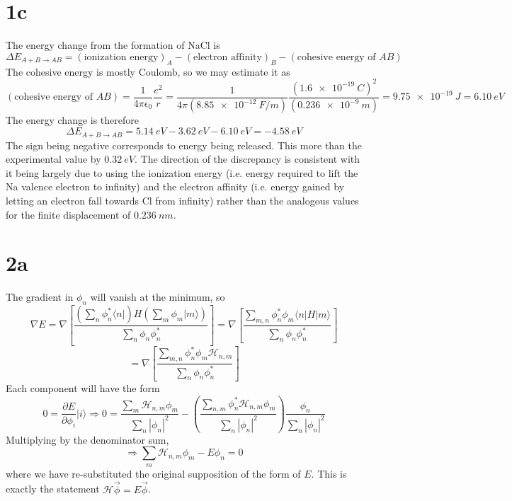 \documentclass{article}
\begin{document}
\section*{1c}
The energy change from the formation of NaCl is
\[\Delta E_{A+B\rightarrow AB}=(\textrm{ionization energy})_{A}-(\textrm{electron affinity})_{B}-(\textrm{cohesive energy of }AB)\]
The cohesive energy is mostly Coulomb, so we may estimate it as
\[
  (\textrm{cohesive energy of }AB)
  =\frac{1}{4\pi\epsilon_{0}}\frac{e^{2}}{r}
  =\frac{1}{4\pi(\SI{8.85e-12}{F/m})}\frac{(\SI{1.6e-19}{C})^{2}}{(\SI{0.236e-9}{m})}
  =\SI{9.75e-19}{J}=\SI{6.10}{eV}
\]
The energy change is therefore
\[
  \Delta E_{A+B\rightarrow AB}=\SI{5.14}{eV}-\SI{3.62}{eV}-\SI{6.10}{eV}=\SI{-4.58}{eV}
\]
The sign being negative corresponds to energy being released.
This more than the experimental value by $\SI{0.32}{eV}$.
The direction of the discrepancy is consistent with it being largely due to using the ionization energy
(i.e. energy required to lift the Na valence electron to infinity) and the electron affinity
(i.e. energy gained by letting an electron fall towards Cl from infinity) rather than the analogous values for the finite displacement
of $\SI{0.236}{nm}$.

\section*{2a}
The gradient in $\phi_{n}$ will vanish at the minimum, so
\[
  \nabla E=\nabla\left[\frac{\left( \sum_{n}\phi_{n}^{*}\langle n | \right)
      H\left(\sum_{m}\phi_{m}|m\rangle \right)}
    {\sum_{n}\phi_{n}\phi_{n}^{*}}\right]
  =\nabla\left[ \frac{\sum_{m,n}\phi_{n}^{*}\phi_{m}\langle n|H|m \rangle}{\sum_{n}\phi_{n}\phi_{n}^{*}} \right]
\]
\[
  =\nabla\left[ \frac{\sum_{m,n}\phi_{n}^{*}\phi_{m}\mathcal{H}_{n,m}}{\sum_{n}\phi_{n}\phi_{n}^{*}} \right]
\]
Each component will have the form
\[
  0=\frac{\partial E}{\partial \phi_{i}}|i\rangle
  \Rightarrow 0 = \frac{\sum_{m}\mathcal{H}_{n,m}\phi_{m}}{\sum_{n}|\phi_{n}|^{2}}
  -\left(  \frac{\sum_{n,m}\phi_{n}^{*}\mathcal{H}_{n,m}\phi_{m}}{\sum_{n}|\phi_{n}|^{2}}\right)\frac{\phi_{n}}{\sum_{n}|\phi_{n}|^{2}}
\]
Multiplying by the denominator sum,
\[\Rightarrow \sum_{m}\mathcal{H}_{n,m}\phi_{m}-E\phi_{n}=0\]
where we have re-substituted the original supposition of the form of $E$.
This is exactly the statement $\mathcal{H}\vec{\phi}=E\vec{\phi}$.
\end{document}
